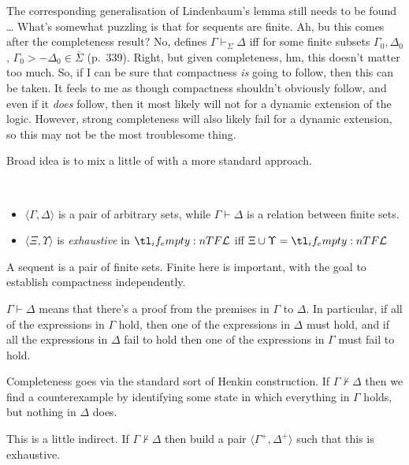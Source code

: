 \documentclass[10pt]{article}
\begin{document}
The corresponding generalisation of Lindenbaum's lemma still needs to be found \dots
What's somewhat puzzling is that for \citeauthor{Blamey:2002aa} sequents are finite.
Ah, bu this comes after the completeness result?
No, \citeauthor{Blamey:2002aa} defines \(\Gamma \vdash_{\Sigma} \Delta\) iff for some finite subsets \(\Gamma_{0}, \Delta_{0}\), \(\Gamma_{0} >- \Delta_{0} \in \overline{\Sigma}\) (p.\ 339).
Right, but given completeness, hm, this doesn't matter too much.
So, if I can be sure that compactness \emph{is} going to follow, then this can be taken.
It feels to me as though compactness shouldn't obviously follow, and even if it \emph{does} follow, then it most likely will not for a dynamic extension of the logic.
However, strong completeness will also likely fail for a dynamic extension, so this may not be the most troublesome thing.


\newpage

Broad idea is to mix a little of \citeauthor{Blamey:2002aa} with a more standard approach.

\begin{definition}\mbox{ }
  \begin{itemize}
  \item \(\langle \Gamma,\Delta \rangle\) is a pair of arbitrary sets, while \(\Gamma \vdash \Delta\) is a relation between finite sets.
  \item \(\langle \Xi,\Upsilon \rangle\) is \emph{exhaustive} in \(\olang{}\) iff \(\Xi \cup \Upsilon = \olang{}\)
  \end{itemize}
\end{definition}

A sequent is a pair of finite sets.
Finite here is important, with the goal to establish compactness independently.

\(\Gamma \vdash \Delta\) means that there's a proof from the premises in \(\Gamma\) to \(\Delta\).
In particular, if all of the expressions in \(\Gamma\) hold, then one of the expressions in \(\Delta\) must hold, and if all the expressions in \(\Delta\) fail to hold then one of the expressions in \(\Gamma\) must fail to hold.

Completeness goes via the standard sort of Henkin construction.
If \(\Gamma \nvdash \Delta\) then we find a counterexample by identifying some state in which everything in \(\Gamma\) holds, but nothing in \(\Delta\) does.

This is a little indirect.
If \(\Gamma \nvdash \Delta\) then build a pair \(\langle \Gamma^{+}, \Delta^{+} \rangle\) such that this is exhaustive.
\end{document}
